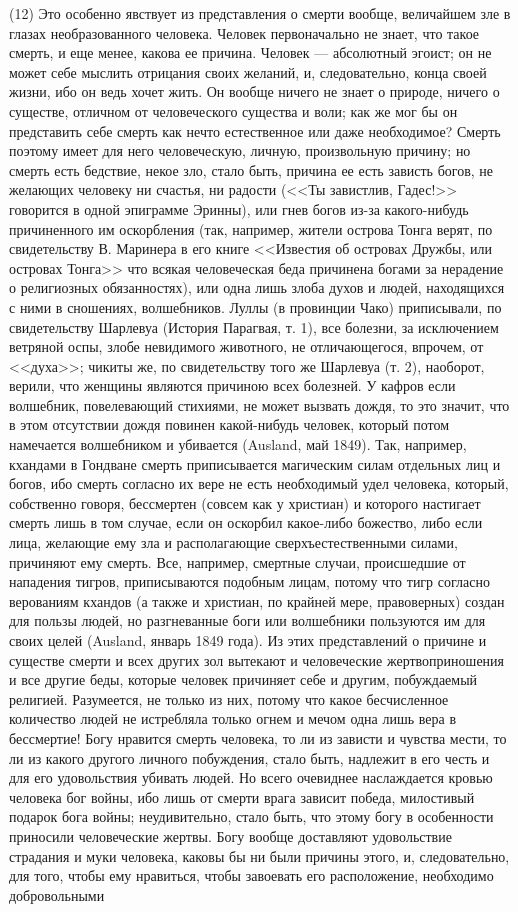 \documentclass[12pt]{article}
\begin{document}
(12) Это особенно явствует из представления о смерти вообще, величайшем зле в глазах необразованного человека. Человек первоначально не знает, что такое смерть, и еще менее, какова ее причина. Человек --- абсолютный эгоист; он не может себе мыслить отрицания своих желаний, и, следовательно, конца своей жизни, ибо он ведь хочет жить. Он вообще ничего не знает о природе, ничего о существе, отличном от человеческого существа и воли; как же мог бы он представить себе смерть как нечто естественное или даже необходимое? Смерть поэтому имеет для него человеческую, личную, произвольную причину; но смерть есть бедствие, некое зло, стало быть, причина ее есть зависть богов, не желающих человеку ни счастья, ни радости (<<Ты завистлив, Гадес!>> говорится в одной эпиграмме Эринны), или гнев богов из-за какого-нибудь причиненного им оскорбления (так, например, жители острова Тонга верят, по свидетельству В. Маринера в его книге <<Известия об островах Дружбы, или островах Тонга>>  что всякая человеческая беда причинена богами за нерадение о религиозных обязанностях), или одна лишь злоба духов и людей, находящихся с ними в сношениях, волшебников. Луллы (в провинции Чако) приписывали, по свидетельству Шарлевуа (История Парагвая, т. 1), все болезни, за исключением ветряной оспы, злобе невидимого животного, не отличающегося, впрочем, от <<духа>>; чикиты же, по свидетельству того же Шарлевуа (т. 2), наоборот, верили, что женщины являются причиною всех болезней. У кафров если волшебник, повелевающий стихиями, не может вызвать дождя, то это значит, что в этом отсутствии дождя повинен какой-нибудь человек, который потом намечается волшебником и убивается (Ausland, май 1849). Так, например, кхандами в Гондване смерть приписывается магическим силам отдельных лиц и богов, ибо смерть согласно их вере не есть необходимый удел человека, который, собственно говоря, бессмертен (совсем как у христиан) и которого настигает смерть лишь в том случае, если он оскорбил какое-либо божество, либо если лица, желающие ему зла и располагающие сверхъестественными силами, причиняют ему смерть. Все, например, смертные случаи, происшедшие от нападения тигров, приписываются подобным лицам, потому что тигр согласно верованиям кхандов (а также и христиан, по крайней мере, правоверных) создан для пользы людей, но разгневанные боги или волшебники пользуются им для своих целей (Ausland, январь 1849 года). Из этих представлений о причине и существе смерти и всех других зол вытекают и человеческие жертвоприношения и все другие беды, которые человек причиняет себе и другим, побуждаемый религией. Разумеется, не только из них, потому что какое бесчисленное количество людей не истребляла только огнем и мечом одна лишь вера в бессмертие! Богу нравится смерть человека, то ли из зависти и чувства мести, то ли из какого другого личного побуждения, стало быть, надлежит в его честь и для его удовольствия убивать людей. Но всего очевиднее наслаждается кровью человека бог войны, ибо лишь от смерти врага зависит победа, милостивый подарок бога войны; неудивительно, стало быть, что этому богу в особенности приносили человеческие жертвы. Богу вообще доставляют удовольствие страдания и муки человека, каковы бы ни были причины этого, и, следовательно, для того, чтобы ему нравиться, чтобы завоевать его расположение, необходимо добровольными 
\end{document}
